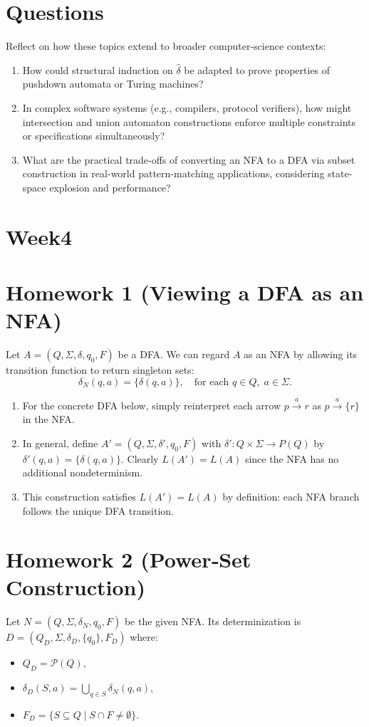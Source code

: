 \documentclass{article}
\begin{document}
\section*{Questions}
Reflect on how these topics extend to broader computer-science contexts:
\begin{enumerate}
  \item How could structural induction on $\hat\delta$ be adapted to prove properties
        of pushdown automata or Turing machines?  
  \item In complex software systems (e.g., compilers, protocol verifiers), how might
        intersection and union automaton constructions enforce multiple constraints
        or specifications simultaneously?  
  \item What are the practical trade-offs of converting an NFA to a DFA via subset
        construction in real-world pattern-matching applications, considering
        state-space explosion and performance?  
\end{enumerate}

\section{Week4}
\section*{Homework 1 (Viewing a DFA as an NFA)}
Let $A=(Q,\Sigma,\delta,q_0,F)$ be a DFA.  We can regard $A$ as an NFA by
allowing its transition function to return singleton sets:
\[
  \delta_N(q,a)=\{\delta(q,a)\},
  \quad\text{for each }q\in Q,\;a\in\Sigma.
\]

\begin{enumerate}[1.]
  \item For the concrete DFA below, simply reinterpret each arrow $p\xrightarrow{a}r$
        as $p\xrightarrow{a}\{r\}$ in the NFA.
  \item In general, define $A'=(Q,\Sigma,\delta',q_0,F)$ with $\delta':Q\times\Sigma\to P(Q)$
        by $\delta'(q,a)=\{\delta(q,a)\}$.  Clearly $L(A')=L(A)$ since the NFA has no
        additional nondeterminism.
  \item This construction satisfies $L(A')=L(A)$ by definition: each NFA branch
        follows the unique DFA transition.
\end{enumerate}

\section*{Homework 2 (Power‐Set Construction)}
Let $N=(Q,\Sigma,\delta_N,q_0,F)$ be the given NFA.  Its determinization is
$D=(Q_D,\Sigma,\delta_D,\{q_0\},F_D)$ where:
\begin{itemize}
  \item $Q_D=\mathcal P(Q)$,
  \item $\delta_D(S,a)=\bigcup_{q\in S}\delta_N(q,a)$,
  \item $F_D=\{S\subseteq Q\mid S\cap F\neq\emptyset\}$.
\end{itemize}
\end{document}
